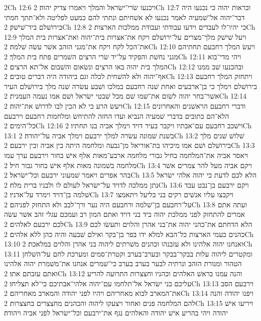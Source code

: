 2Ch 12:6  ויכנעו שׂרי־ישׂראל והמלך ויאמרו צדיק יהוה׃
2Ch 12:7  ובראות יהוה כי נכנעו היה דבר־יהוה אל־שׁמעיה לאמר נכנעו לא אשׁחיתם ונתתי להם כמעט לפליטה ולא־תתך חמתי בירושׁלם ביד־שׁישׁק׃
2Ch 12:8  כי יהיו־לו לעבדים וידעו עבודתי ועבודת ממלכות הארצות׃
2Ch 12:9  ויעל שׁישׁק מלך־מצרים על־ירושׁלם ויקח את־אצרות בית־יהוה ואת־אצרות בית המלך את־הכל לקח ויקח את־מגני הזהב אשׁר עשׂה שׁלמה׃
2Ch 12:10  ויעשׂ המלך רחבעם תחתיהם מגני נחשׁת והפקיד על־יד שׂרי הרצים השׁמרים פתח בית המלך׃
2Ch 12:11  ויהי מדי־בוא המלך בית יהוה באו הרצים ונשׂאום והשׁבום אל־תא הרצים׃
2Ch 12:12  ובהכנעו שׁב ממנו אף־יהוה ולא להשׁחית לכלה וגם ביהודה היה דברים טובים׃
2Ch 12:13  ויתחזק המלך רחבעם בירושׁלם וימלך כי בן־ארבעים ואחת שׁנה רחבעם במלכו ושׁבע עשׂרה שׁנה מלך בירושׁלם העיר אשׁר־בחר יהוה לשׂום את־שׁמו שׁם מכל שׁבטי ישׂראל ושׁם אמו נעמה העמנית׃
2Ch 12:14  ויעשׂ הרע כי לא הכין לבו לדרושׁ את־יהוה׃
2Ch 12:15  ודברי רחבעם הראשׁנים והאחרונים הלא־הם כתובים בדברי שׁמעיה הנביא ועדו החזה להתיחשׂ ומלחמות רחבעם וירבעם כל־הימים׃
2Ch 12:16  וישׁכב רחבעם עם־אבתיו ויקבר בעיר דויד וימלך אביה בנו תחתיו׃
2Ch 13:1  בשׁנת שׁמונה עשׂרה למלך ירבעם וימלך אביה על־יהודה׃
2Ch 13:2  שׁלושׁ שׁנים מלך בירושׁלם ושׁם אמו מיכיהו בת־אוריאל מן־גבעה ומלחמה היתה בין אביה ובין ירבעם׃
2Ch 13:3  ויאסר אביה את־המלחמה בחיל גבורי מלחמה ארבע־מאות אלף אישׁ בחור וירבעם ערך עמו מלחמה בשׁמונה מאות אלף אישׁ בחור גבור חיל׃
2Ch 13:4  ויקם אביה מעל להר צמרים אשׁר בהר אפרים ויאמר שׁמעוני ירבעם וכל־ישׂראל׃
2Ch 13:5  הלא לכם לדעת כי יהוה אלהי ישׂראל נתן ממלכה לדויד על־ישׂראל לעולם לו ולבניו ברית מלח׃
2Ch 13:6  ויקם ירבעם בן־נבט עבד שׁלמה בן־דויד וימרד על־אדניו׃
2Ch 13:7  ויקבצו עליו אנשׁים רקים בני בליעל ויתאמצו על־רחבעם בן־שׁלמה ורחבעם היה נער ורך־לבב ולא התחזק לפניהם׃
2Ch 13:8  ועתה אתם אמרים להתחזק לפני ממלכת יהוה ביד בני דויד ואתם המון רב ועמכם עגלי זהב אשׁר עשׂה לכם ירבעם לאלהים׃
2Ch 13:9  הלא הדחתם את־כהני יהוה את־בני אהרן והלוים ותעשׂו לכם כהנים כעמי הארצות כל־הבא למלא ידו בפר בן־בקר ואילם שׁבעה והיה כהן ללא אלהים׃
2Ch 13:10  ואנחנו יהוה אלהינו ולא עזבנהו וכהנים משׁרתים ליהוה בני אהרן והלוים במלאכת׃
2Ch 13:11  ומקטרים ליהוה עלות בבקר־בבקר ובערב־בערב וקטרת־סמים ומערכת לחם על־השׁלחן הטהור ומנורת הזהב ונרתיה לבער בערב בערב כי־שׁמרים אנחנו את־משׁמרת יהוה אלהינו ואתם עזבתם אתו׃
2Ch 13:12  והנה עמנו בראשׁ האלהים וכהניו וחצצרות התרועה להריע עליכם בני ישׂראל אל־תלחמו עם־יהוה אלהי־אבתיכם כי־לא תצליחו׃
2Ch 13:13  וירבעם הסב את־המארב לבוא מאחריהם ויהיו לפני יהודה והמארב מאחריהם׃
2Ch 13:14  ויפנו יהודה והנה להם המלחמה פנים ואחור ויצעקו ליהוה והכהנים מחצצרים בחצצרות׃
2Ch 13:15  ויריעו אישׁ יהודה ויהי בהריע אישׁ יהודה והאלהים נגף את־ירבעם וכל־ישׂראל לפני אביה ויהודה׃
